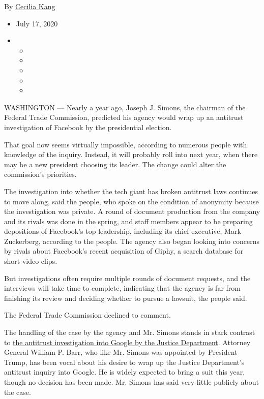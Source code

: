 By \href{https://www.nytimes3xbfgragh.onion/by/cecilia-kang}{Cecilia
Kang}

\begin{itemize}
\item
  July 17, 2020
\item
  \begin{itemize}
  \item
  \item
  \item
  \item
  \item
  \end{itemize}
\end{itemize}

WASHINGTON --- Nearly a year ago, Joseph J. Simons, the chairman of the
Federal Trade Commission, predicted his agency would wrap up an
antitrust investigation of Facebook by the presidential election.

That goal now seems virtually impossible, according to numerous people
with knowledge of the inquiry. Instead, it will probably roll into next
year, when there may be a new president choosing its leader. The change
could alter the commission's priorities.

The investigation into whether the tech giant has broken antitrust laws
continues to move along, said the people, who spoke on the condition of
anonymity because the investigation was private. A round of document
production from the company and its rivals was done in the spring, and
staff members appear to be preparing depositions of Facebook's top
leadership, including its chief executive, Mark Zuckerberg, according to
the people. The agency also began looking into concerns by rivals about
Facebook's recent acquisition of Giphy, a search database for short
video clips.

But investigations often require multiple rounds of document requests,
and the interviews will take time to complete, indicating that the
agency is far from finishing its review and deciding whether to pursue a
lawsuit, the people said.

The Federal Trade Commission declined to comment.

The handling of the case by the agency and Mr. Simons stands in stark
contrast to
\href{https://www.nytimes3xbfgragh.onion/2020/06/25/technology/barr-google-investigation.html}{the
antitrust investigation into Google by the Justice Department}. Attorney
General William P. Barr, who like Mr. Simons was appointed by President
Trump, has been vocal about his desire to wrap up the Justice
Department's antitrust inquiry into Google. He is widely expected to
bring a suit this year, though no decision has been made. Mr. Simons has
said very little publicly about the case.

